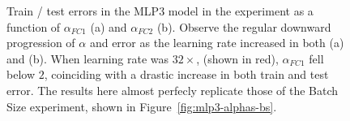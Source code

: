 \begin{figure}[t]
    \centering

    \caption{
            Train / test errors in the MLP3 model in the {\bf \emph{\LearningRate}} experiment as a function of $\alpha_{FC1}$ (a) and $\alpha_{FC2}$ (b). 
            Observe the regular downward progression of $\alpha$ and error as the learning 
            rate increased in both (a) and (b). When learning rate was $32\times$, (shown in red), $\alpha_{FC1}$ fell 
            below $2$, coinciding with a drastic increase in both train and test error. The results here almost 
            perfecly replicate those of the Batch Size experiment, shown in Figure~\ref{fig:mlp3-alphas-bs}.
    }
 \label{fig:mlp3-alphas-lr}
\end{figure}

